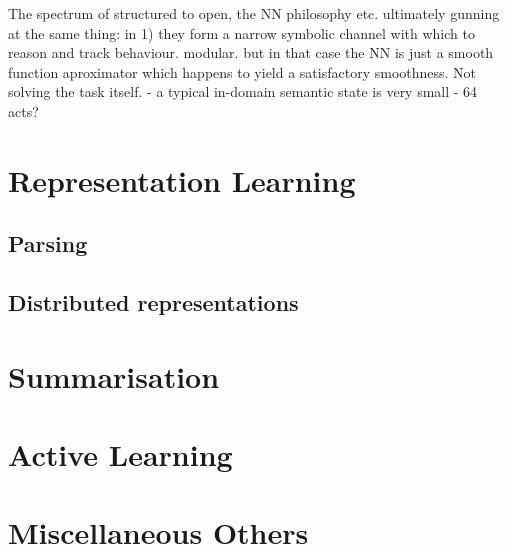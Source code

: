 \documentclass[11pt,letterpaper]{article}
\begin{document}
The spectrum of structured to open, the NN philosophy etc. 
ultimately gunning at the same thing: in 1) they form a narrow symbolic channel with which to reason and track behaviour. modular. but in that case the NN is just a smooth function aproximator which happens to yield a satisfactory smoothness. Not solving the task itself. 
- a typical in-domain semantic state is very small - 64 acts? 






\cite{li2016deep} %
\cite{vinyals2015neural} %

\cite{su2016line}




\cite{liu2016not}
\cite{su2015learning}


\cite{lowe2015ubuntu}


\section{Representation Learning}
\subsection{Parsing}
\subsection{Distributed representations}

\section{Summarisation}

\section{Active Learning}

\section{Miscellaneous Others}












\end{document}
